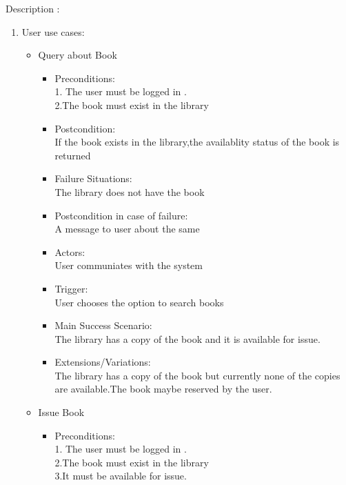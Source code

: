 \documentclass{article}
\begin{document}
Description :
\\
\begin{enumerate}
\item User use cases:
	\begin{itemize}
	
	\item Query about Book\\
	\begin{itemize}
	\item Preconditions:\\
	1. The user must be logged in .\\
	2.The book must exist in the library\\
\item  Postcondition: \\If the book exists in the library,the availablity status of the book is returned\\
 \item Failure Situations:\\ The library does not have  the book \\
 \item Postcondition in case of failure:\\A message to user about the same\\
\item  Actors:\\ User communiates with the system\\
\item  Trigger:\\ User chooses the option to search books\\
 \item Main Success Scenario: \\The library has a copy of the book and it is available for issue.\\
\item  Extensions/Variations: \\The library has a copy of the book but currently none of the copies are available.The book maybe reserved by the user.
	\end{itemize}
 \item Issue Book\\
	\begin{itemize}
	 \item Preconditions:\\
	 1. The user must be logged in .\\
	 2.The book must exist in the library \\
	 3.It must be available for issue.\\

\end{itemize}
\end{itemize}
\end{enumerate}
\end{document}
